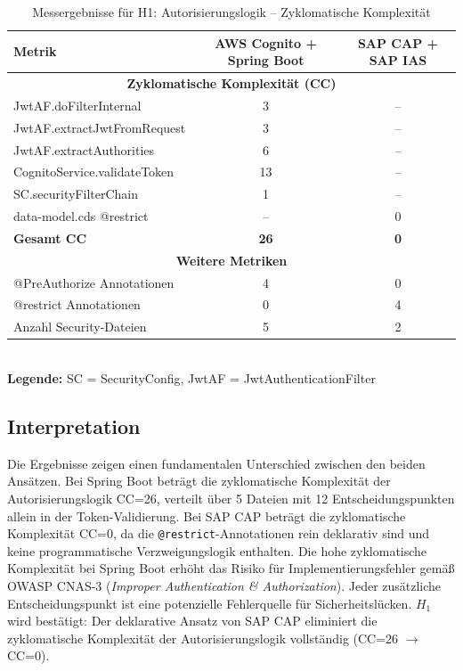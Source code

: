 \begin{table}[h]
    \centering
    \begin{tabular}{|l|c|c|}
        \hline
        \textbf{Metrik}          & \textbf{AWS Cognito + Spring Boot} & \textbf{SAP CAP + SAP IAS}  \\
        \hline
        \multicolumn{3}{|c|}{\textbf{Zyklomatische Komplexität (CC)}} \\
        \hline
        JwtAF.doFilterInternal                     & 3              & --  \\
        \hline
        JwtAF.extractJwtFromRequest                & 3                    & --  \\
        \hline
        JwtAF.extractAuthorities                   & 6                & --  \\
        \hline
        CognitoService.validateToken     & 13             & --  \\
        \hline
        SC.securityFilterChain                 & 1              & --  \\
        \hline
        data-model.cds @restrict     & --             & 0 \\
        \hline
        \textbf{Gesamt CC} & \textbf{26}              & \textbf{0}  \\
        \hline
        \multicolumn{3}{|c|}{\textbf{Weitere Metriken}} \\
        \hline
        @PreAuthorize Annotationen & 4              & 0 \\
        \hline
        @restrict Annotationen & 0              & 4 \\
        \hline
        Anzahl Security-Dateien  & 5              & 2 \\
        \hline
    \end{tabular}
    \footnotesize\\
    \textbf{Legende:} SC = SecurityConfig, JwtAF = JwtAuthenticationFilter
    \caption{Messergebnisse für H1: Autorisierungslogik -- Zyklomatische Komplexität}
    \label{tab:h1_ergebnisse}
\end{table}

\subsection{Interpretation}

Die Ergebnisse zeigen einen fundamentalen Unterschied zwischen den beiden Ansätzen.
Bei Spring Boot beträgt die zyklomatische Komplexität der Autorisierungslogik CC=26, verteilt über 5 Dateien mit 12 Entscheidungspunkten allein in der Token-Validierung. Bei \ac{SAP CAP} beträgt die zyklomatische Komplexität CC=0, da die \texttt{@restrict}-Annotationen rein deklarativ sind und keine programmatische Verzweigungslogik enthalten.
Die hohe zyklomatische Komplexität bei Spring Boot erhöht das Risiko für Implementierungsfehler gemäß \ac{OWASP} CNAS-3 (\textit{Improper Authentication \& Authorization}). Jeder zusätzliche Entscheidungspunkt ist eine potenzielle Fehlerquelle für Sicherheitslücken. $H_1$ wird bestätigt: Der deklarative Ansatz von \ac{SAP CAP} eliminiert die zyklomatische Komplexität der Autorisierungslogik vollständig (CC=26 $\rightarrow$ CC=0).


